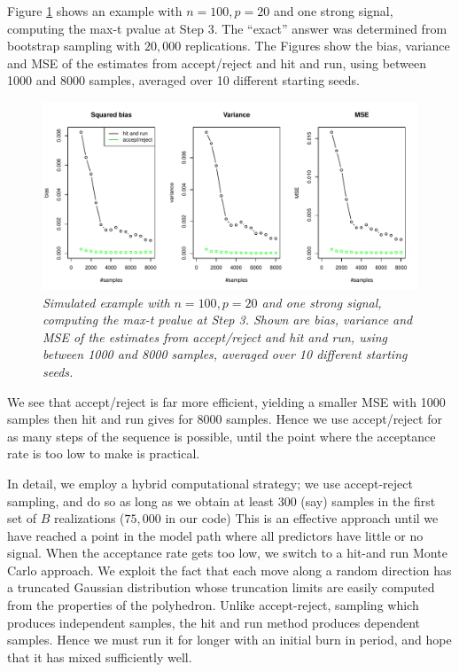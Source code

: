 \documentclass{article}
\begin{document}
Figure \ref{fig:comparison} shows an example with $n=100, p=20$ and one strong signal, computing the max-t pvalue at Step 3.
The ``exact'' answer  was determined from bootstrap sampling with $20,000$ replications.
The Figures show the bias, variance and MSE of the estimates from accept/reject and hit and run, using between 1000 and 8000 samples, averaged
over 10 different starting seeds.
\begin{figure}[htp]
\centering
  \includegraphics[width=\textwidth]{figs/comparison.pdf}
  \caption{\em Simulated example with $n= 100, p=20$ and one strong signal, computing the max-t pvalue at Step 3.  Shown are bias, variance and MSE of the estimates from accept/reject and hit and run, using between 1000 and 8000 samples, averaged
over 10 different starting seeds.
}
  \label{fig:comparison}
\end{figure}
We see that accept/reject is far more efficient, yielding a smaller MSE with 1000 samples then hit and run gives for  8000 samples.
Hence we use accept/reject for as many steps of the sequence is possible,  until the point where the acceptance rate is too low to make is practical.

In detail, we employ a hybrid computational strategy; we use accept-reject sampling, and do so as long as we obtain at least 300 (say) samples in the first set
of $B$ realizations ($75,000$ in our code)  This is an effective approach until we have reached a point in the model path where all predictors have little or no signal.
When the acceptance rate gets too low, we switch to a hit-and run Monte Carlo approach. We exploit the fact that each move along a random direction 
has a truncated Gaussian distribution whose truncation limits are easily computed from the properties of the polyhedron. Unlike accept-reject, sampling
which produces independent samples,  the hit and run method produces dependent samples. Hence we must run it for longer with an initial burn in period,
and hope that it has mixed sufficiently well.
\end{document}
